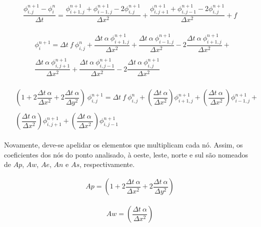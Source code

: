\begin{align}
\label{expttone}
\dfrac{\phi_{i,j}^{n+1} - \phi_{i}^{n}}{\Delta t} = \dfrac{\phi_{i+1,j}^{n+1} + \phi_{i-1,j}^{n+1} - 2 \phi_{i,j}^{n+1}}{\Delta x^2} + \dfrac{\phi_{i,j+1}^{n+1} + \phi_{i,j-1}^{n+1} - 2 \phi_{i,j}^{n+1}}{\Delta x^2} + f
\end{align}
	

\begin{align}
\label{exptttwo}
\begin{array}{cc}
&\phi_{i}^{n+1} = \Delta t \ f \ \phi_{i,j}^{n} + \dfrac{\Delta t \  \alpha \ \phi_{i+1,j}^{n+1}}{\Delta x^2} + \dfrac{\Delta t \ \alpha \ \phi_{i-1,j}^{n+1}}{\Delta x^2} - 2 \dfrac{\Delta t \ \alpha \ \phi_{i+1,j}^{n+1}}{\Delta x^2} + \\
&\\
&\dfrac{\Delta t \  \alpha \ \phi_{i,j+1}^{n+1}}{\Delta x^2} + \dfrac{\Delta t \ \alpha \ \phi_{i,j-1}^{n+1}}{\Delta x^2} - 2 \dfrac{\Delta t \ \alpha \ \phi_{i,j}^{n+1}}{\Delta x^2}
\end{array}
\end{align}


\begin{align}
\label{expttthree}
\begin{array}{cc}
&\left(1 + 2 \dfrac{\Delta t \ \alpha}{\Delta x^2} + 2 \dfrac{\Delta t \ \alpha}{\Delta y^2}\right) \ \phi_{i,j}^{n+1} = \Delta t \ f \ \phi_{i,j}^{n} + \left( \dfrac{\Delta t \ \alpha}{\Delta x^2} \right)  \phi_{i+1,j}^{n+1} + \left( \dfrac{\Delta t \ \alpha \ }{\Delta x^2} \right) \phi_{i-1,j}^{n+1} + \\
&\\
& \left( \dfrac{\Delta t \ \alpha}{\Delta x^2} \right)  \phi_{i,j+1}^{n+1} + \left( \dfrac{\Delta t \ \alpha \ }{\Delta x^2} \right) \phi_{i,j-1}^{n+1} 
\end{array}
\end{align}

	Novamente, deve-se apelidar os elementos que multiplicam cada nó. Assim, os coeficientes dos nós do ponto analisado, à oeste, leste, norte e sul são nomeados de $Ap$, $Aw$, $Ae$, $An$ e $As$, respectivamente.
	
\begin{align}
\label{expttfour}
Ap =  \left(1 + 2 \dfrac{\Delta t \ \alpha}{\Delta x^2}  + 2 \dfrac{\Delta t \ \alpha}{\Delta y^2}\right)
\end{align}

\begin{align}
\label{expttfive}
Aw =  \left( \dfrac{\Delta t \ \alpha}{\Delta x^2} \right)
\end{align}

